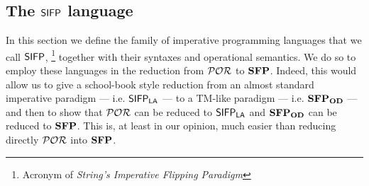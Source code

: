 \subsection{The $\mathsf{SIFP}$ language}
\label{sub:sifplan}

In this section we define the family of imperative programming languages that we call $\mathsf{SIFP}$,
\footnote{Acronym of \emph{String's Imperative Flipping Paradigm}}
together with their syntaxes and operational semantics. We do so to
employ these languages in the reduction from $\mathcal{POR}$ to $\mathbf{SFP}$.
%
Indeed, this would allow us to give a school-book style reduction from
an almost standard imperative paradigm --- i.e. $\mathsf{SIFP_{{\mathsf{LA}}}}$ ---
to a TM-like paradigm --- i.e. $\mathbf{SFP_{\mathbf{OD}}}$ --- and then to show that
$\mathcal{POR}$ can be reduced to $\mathsf{SIFP_{{\mathsf{LA}}}}$ and $\mathbf{SFP_{\mathbf{OD}}}$ can be reduced to $\mathbf{SFP}$.
This is, at least in our opinion, much easier than reducing directly $\mathcal{POR}$ into $\mathbf{SFP}$.

